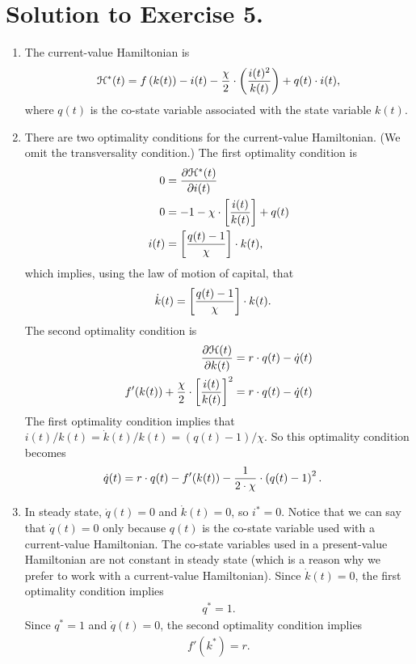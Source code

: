 \documentclass[letterpaper,12pt,leqno]{article}
\begin{document}
\section*{Solution to Exercise 5.}
\begin{enumerate}
\item The current-value Hamiltonian is
\begin{align*}
\mathcal{H}^{*}(t)=f\left( k(t) \right) -i(t)-\frac{\chi}{2}\cdot \left( \frac{i(t)^{2}}{k(t)} \right)+q(t)\cdot i(t), 
\end{align*}
where $q(t)$ is the co-state variable associated with the state variable $k(t)$.
\item There are two optimality conditions for the current-value Hamiltonian. (We omit the transversality condition.) The first optimality condition is
\begin{align*}
0&=\frac{\partial \mathcal{H}^{*}(t)}{\partial i(t)} \\
0&=-1-\chi \cdot \left[ \frac{i(t)}{k(t)} \right]+q(t) \\
i(t)&=\left[ \frac{q(t)-1}{\chi} \right]\cdot k(t),
\end{align*}
which implies, using the law of motion of capital, that
\begin{align*}
\dot{k}(t)&=\left[ \frac{q(t)-1}{\chi} \right]\cdot k(t).
\end{align*}
The second optimality condition is
\begin{align*}
\frac{\partial \mathcal{H}(t)}{\partial k(t)} &=r\cdot q(t)-\dot{q}(t)\\
f'(k(t)) +\frac{\chi}{2}\cdot \left[ \frac{i(t)}{k(t)} \right]^{2}&=r\cdot q(t)-\dot{q}(t)
\end{align*}
The first optimality condition implies that $i(t)/k(t)=\dot{k}(t)/k(t)=(q(t)-1)/\chi$. So this optimality condition becomes
\begin{align*}
\dot{q}(t)&=r\cdot q(t)-f'(k(t))-\frac{1}{2\cdot \chi}\cdot \left( q(t)-1 \right)^{2}.
\end{align*}
\item In steady state, $\dot{q}(t)=0$ and $\dot{k}(t)=0$, so $i^{*}=0$. Notice that we can say that $\dot{q}(t)=0$ only because $q(t)$ is the co-state variable used with a current-value Hamiltonian. The co-state variables used in a present-value Hamiltonian are not constant in steady state (which is a reason why we prefer to work with a current-value Hamiltonian). Since $\dot{k}(t)=0$, the first optimality condition implies
\begin{align*}
q^{*}=1.
\end{align*}
Since $q^{*}=1$ and $\dot{q}(t)=0$, the second optimality condition implies
\begin{align*} 
f'(k^{*})=r.
\end{align*}
\end{enumerate}
\end{document}
